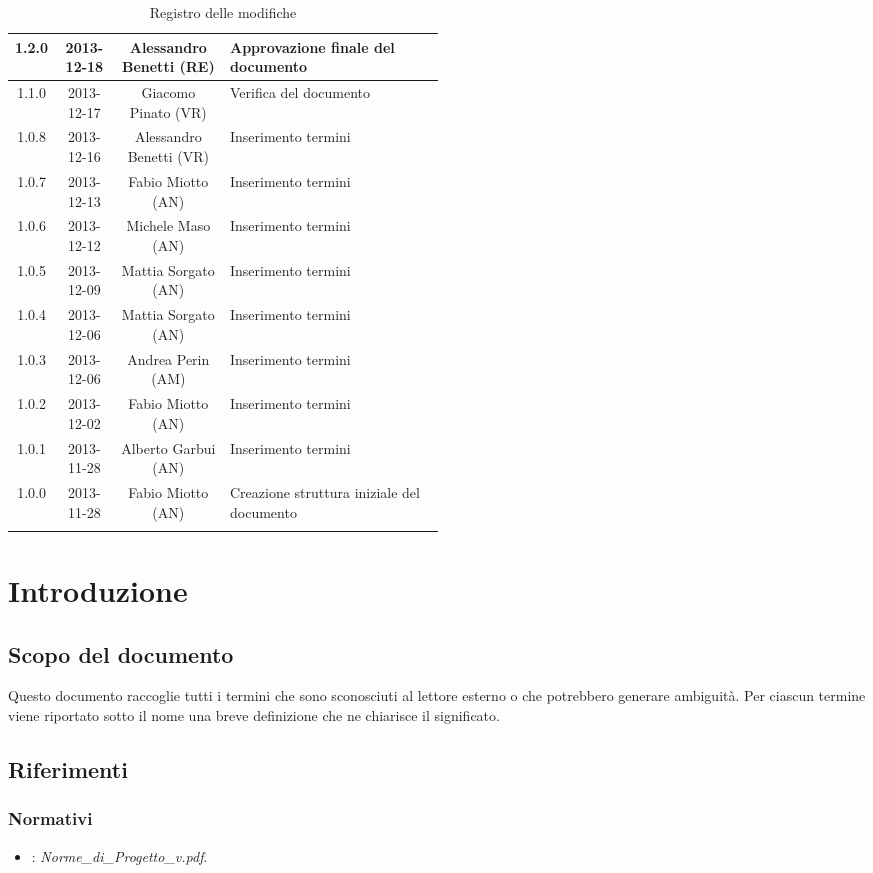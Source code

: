 \begin{center}
\begin{longtable}{|c|c|c|p{0.5\linewidth}|}
\midrule
1.2.0 & 2013-12-18 & Alessandro Benetti (RE) & Approvazione finale del documento\\
\midrule
1.1.0 & 2013-12-17 & Giacomo Pinato (VR) & Verifica del documento \\
\midrule
1.0.8 & 2013-12-16 & Alessandro Benetti (VR) & Inserimento termini\\
\midrule
1.0.7 & 2013-12-13 & Fabio Miotto (AN) & Inserimento termini\\
\midrule
1.0.6 & 2013-12-12 & Michele Maso (AN) & Inserimento termini\\
\midrule
1.0.5 & 2013-12-09 & Mattia Sorgato (AN) & Inserimento termini\\
\midrule
1.0.4 & 2013-12-06 & Mattia Sorgato (AN) & Inserimento termini \\
\midrule
1.0.3 & 2013-12-06 & Andrea Perin (AM) & Inserimento termini\\
\midrule
1.0.2 & 2013-12-02 & Fabio Miotto (AN) & Inserimento termini\\
\midrule
1.0.1 & 2013-11-28 & Alberto Garbui (AN) & Inserimento termini\\
\midrule
1.0.0 & 2013-11-28 & Fabio Miotto (AN) & Creazione struttura iniziale del documento\\


\bottomrule
\caption{Registro delle modifiche}
\label{tab:changelog}
\end{longtable}
\end{center}


\newpage
\section{Introduzione}%
\label{1.0}
\subsection{Scopo del documento}%
\label{1.1}
Questo documento raccoglie tutti i termini che sono sconosciuti al lettore esterno o che potrebbero generare ambiguità. Per ciascun termine viene riportato sotto il nome una breve definizione che ne chiarisce il significato.
\subsection{Riferimenti} %
\label{1.4}
\subsubsection{Normativi} %
\label{1.4.1}
\begin{itemize}
\item {}: \emph{Norme\_{}di\_{}Progetto\_{}v\versioneNormeDiProgetto{}.pdf}.\\
\end{itemize}

